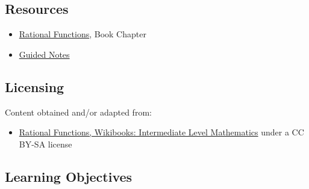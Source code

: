 \subsection{Resources}
\label{sss:reso-55b5}




\begin{itemize}
    \item \href{https://mathresearch.utsa.edu/wikiFiles/MAT1053/Rational_Functions/MAT1053_M4.2Rational_Functions.pdf}{Rational Functions}, Book Chapter
    \item \href{https://mathresearch.utsa.edu/wikiFiles/MAT1053/Rational_Functions/MAT1053_M4.2Rational_FunctionsGN.pdf}{Guided Notes}
\end{itemize}


\subsection{Licensing}
\label{sss:lice-7352}




Content obtained and/or adapted from:



\begin{itemize}
    \item \href{https://en.wikibooks.org/wiki/Intermediate_level_Mathematics/Rational_functions}{Rational Functions, Wikibooks: Intermediate Level Mathematics} under a CC BY-SA license
\end{itemize}


\subsection{Learning Objectives}
\label{ssec:lear-fe6e}


